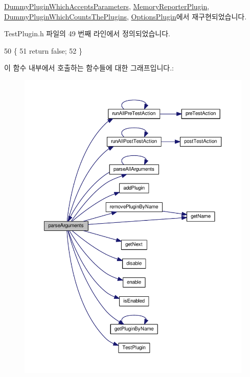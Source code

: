 \hyperlink{class_dummy_plugin_which_accepts_parameters_ab435f2817ffaaf4cd704c1b78100b6e0}{Dummy\+Plugin\+Which\+Accepts\+Parameters}, \hyperlink{class_memory_reporter_plugin_a52f577dfe7627722cfcbd0fca54e86e0}{Memory\+Reporter\+Plugin}, \hyperlink{class_dummy_plugin_which_counts_the_plugins_a167c2b07a0f83726bb9b1d1c0d741f88}{Dummy\+Plugin\+Which\+Counts\+The\+Plugins}, \hyperlink{class_options_plugin_a7bbc148b42628cba5c4e0b427a987888}{Options\+Plugin}에서 재구현되었습니다.



Test\+Plugin.\+h 파일의 49 번째 라인에서 정의되었습니다.


\begin{DoxyCode}
50     \{
51         \textcolor{keywordflow}{return} \textcolor{keyword}{false};
52     \}
\end{DoxyCode}


이 함수 내부에서 호출하는 함수들에 대한 그래프입니다.\+:
\nopagebreak
\begin{figure}[H]
\begin{center}
\leavevmode
\includegraphics[width=350pt]{class_test_plugin_a167c2b07a0f83726bb9b1d1c0d741f88_cgraph}
\end{center}
\end{figure}




